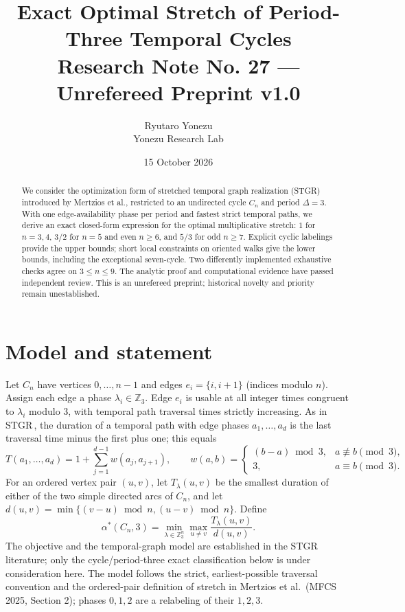 \documentclass[10pt,a4paper]{article}
\title{Exact Optimal Stretch of Period-Three Temporal Cycles\\[3pt]
\large Research Note No. 27 --- Unrefereed Preprint v1.0}
\author{Ryutaro Yonezu\\\small Yonezu Research Lab}
\date{15 October 2026}
\newcommand{\opt}{\alpha^*}
\begin{document}
\maketitle
\begin{abstract}
We consider the optimization form of stretched temporal graph realization (STGR) introduced by Mertzios et al., restricted to an undirected cycle $C_n$ and period $\Delta=3$.  With one edge-availability phase per period and fastest strict temporal paths, we derive an exact closed-form expression for the optimal multiplicative stretch: $1$ for $n=3,4$, $3/2$ for $n=5$ and even $n\ge6$, and $5/3$ for odd $n\ge7$.  Explicit cyclic labelings provide the upper bounds; short local constraints on oriented walks give the lower bounds, including the exceptional seven-cycle.  Two differently implemented exhaustive checks agree on $3\le n\le9$.  The analytic proof and computational evidence have passed independent review. This is an unrefereed preprint; historical novelty and priority remain unestablished.
\end{abstract}

\section{Model and statement}
Let $C_n$ have vertices $0,\ldots,n-1$ and edges $e_i=\{i,i+1\}$ (indices modulo $n$). Assign each edge a phase $\lambda_i\in\mathbb Z_3$. Edge $e_i$ is usable at all integer times congruent to $\lambda_i$ modulo $3$, with temporal path traversal times strictly increasing. As in STGR\,\cite{mertzios2025}, the duration of a temporal path with edge phases $a_1,\dots,a_d$ is the last traversal time minus the first plus one; this equals
\begin{equation}\label{eq:duration}
T(a_1,\ldots,a_d)=1+\sum_{j=1}^{d-1}w(a_j,a_{j+1}),\qquad
w(a,b)=\begin{cases}(b-a)\bmod 3,&a\not\equiv b\pmod3,\\3,&a\equiv b\pmod3.\end{cases}
\end{equation}
For an ordered vertex pair $(u,v)$, let $T_\lambda(u,v)$ be the smallest duration of either of the two simple directed arcs of $C_n$, and let $d(u,v)=\min\{(v-u)\bmod n,(u-v)\bmod n\}$. Define
\[
\opt(C_n,3)=\min_{\lambda\in\mathbb Z_3^n}\max_{u\ne v}\frac{T_\lambda(u,v)}{d(u,v)}.
\]
The objective and the temporal-graph model are established in the STGR literature; only the cycle/period-three exact classification below is under consideration here. The model follows the strict, earliest-possible traversal convention and the ordered-pair definition of stretch in Mertzios et al.\ (MFCS 2025, Section 2); phases $0,1,2$ are a relabeling of their $1,2,3$.
\end{document}
